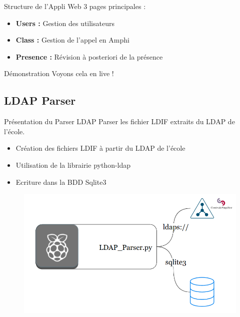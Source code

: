 \documentclass[aspectratio=169]{beamer}
\begin{document}
\begin{frame}{Structure de l'Appli Web}
  3 pages principales :
  \begin{itemize}
    \item \textbf{Users :} Gestion des utilisateurs
    \item \textbf{Class :} Gestion de l'appel en Amphi
    \item \textbf{Presence :} Révision à posteriori de la présence
  \end{itemize}
\end{frame}

\begin{frame}{Démonstration}
  Voyons cela en live !
\end{frame}

\subsection{LDAP Parser}

\begin{frame}{Présentation du Parser LDAP}
    Parser les fichier LDIF extraits du LDAP de l'école.
    \begin{itemize}
        \item Création des fichiers LDIF à partir du LDAP de l'école
        \item Utilisation de la librairie python-ldap
        \item Ecriture dans la BDD Sqlite3
    \end{itemize}
    \begin{figure}
        \centering
        \includegraphics[width=.45\textwidth]{../assets/ldapparserarchitecture.png}
    \end{figure}
\end{frame}
\end{document}
